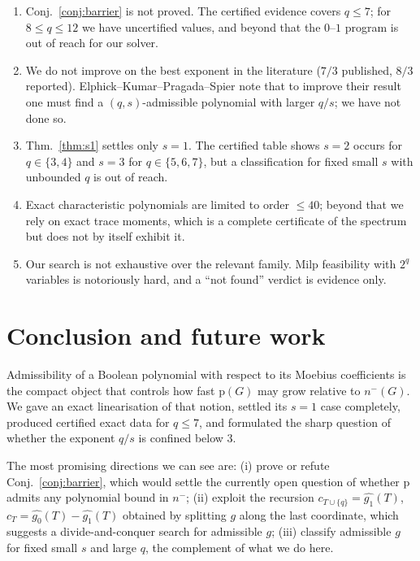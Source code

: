 \documentclass[11pt,a4paper]{article}
\theoremstyle{plain}
\theoremstyle{definition}
\newcommand{\pp}{\mathrm{p}}
\begin{document}
\begin{enumerate}
\item \textup{Conj.~\ref{conj:barrier}} is not proved.  The certified evidence covers
      $q\le7$; for $8\le q\le12$ we have uncertified values, and beyond that the
      $0$--$1$ program is out of reach for our solver.
\item We do not improve on the best exponent in the literature ($7/3$ published,
      $8/3$ reported).  Elphick--Kumar--Pragada--Spier note that to improve their result
      one must find a $(q,s)$-admissible polynomial with larger $q/s$; we have not done so.
\item Thm.~\ref{thm:s1} settles only $s=1$.  The certified table shows $s=2$ occurs for
      $q\in\{3,4\}$ and $s=3$ for $q\in\{5,6,7\}$, but a classification for fixed small $s$
      with unbounded $q$ is out of reach.
\item Exact characteristic polynomials are limited to order $\le40$; beyond that we rely on
      exact trace moments, which is a complete certificate of the spectrum but does not
      by itself exhibit it.
\item Our search is not exhaustive over the relevant family.  Milp feasibility with
      $2^q$ variables is notoriously hard, and a ``not found'' verdict is evidence only.
\end{enumerate}

\section{Conclusion and future work}

Admissibility of a Boolean polynomial with respect to its Moebius coefficients is the
compact object that controls how fast $\pp(G)$ may grow relative to $n^-(G)$.  We gave an
exact linearisation of that notion, settled its $s=1$ case completely, produced certified
exact data for $q\le7$, and formulated the sharp question of whether the exponent $q/s$ is
confined below $3$.

The most promising directions we can see are: (i) prove or refute
\textup{Conj.~\ref{conj:barrier}}, which would settle the currently open question of
whether $\pp$ admits any polynomial bound in $n^-$; (ii) exploit the recursion
$c_{T\cup\{q\}}=\widehat{g_1}(T)$, $c_T=\widehat{g_0}(T)-\widehat{g_1}(T)$ obtained by
splitting $g$ along the last coordinate, which suggests a divide-and-conquer search for
admissible $g$; (iii) classify admissible $g$ for fixed small $s$ and large $q$, the
complement of what we do here.
\end{document}
